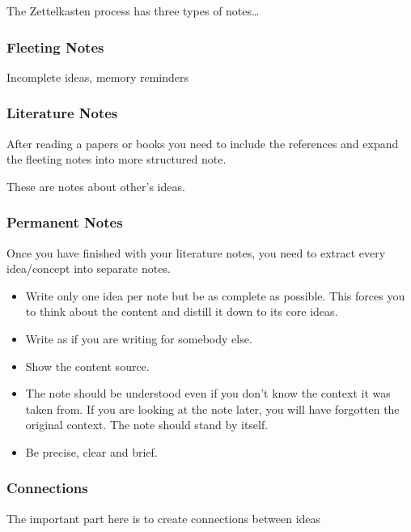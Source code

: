 \documentclass[11pt]{article}
\begin{document}
The Zettelkasten process has three types of notes\ldots{}

\subsubsection{Fleeting Notes}
\label{sec:orgbf37a7b}

Incomplete ideas, memory reminders

\subsubsection{Literature Notes}
\label{sec:orga592402}

After reading a papers or books you need to include  the references and expand the fleeting notes into more structured note.

These are notes about other's ideas.


\subsubsection{Permanent Notes}
\label{sec:orga12d5ca}

Once you have finished with your literature notes, you need to extract every idea/concept into separate notes.


\begin{itemize}
\item Write only one idea per note but be as complete as possible. This forces you to think about the content and distill it down to its core ideas.
\item Write as if you are writing for somebody else.
\item Show the content source.
\item The note should be understood even if you don't know the context it was taken from. If you are looking at the note later, you will have forgotten the original context. The note should stand by itself.
\item Be precise, clear and brief.
\end{itemize}

\subsubsection{Connections}
\label{sec:orgbcf8c18}

The important part here is to create  connections between ideas
\end{document}
